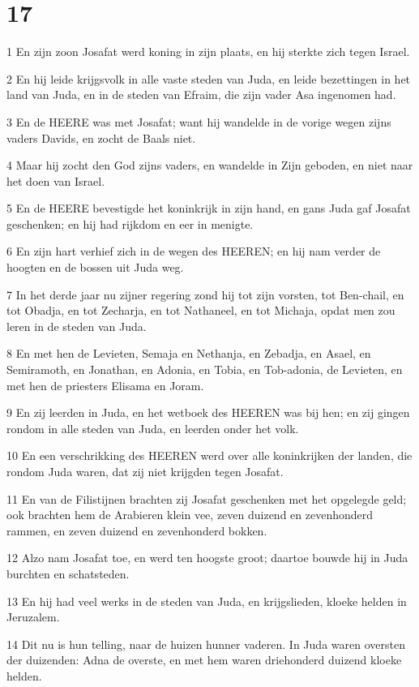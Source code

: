 \chapter{17}

\par 1 En zijn zoon Josafat werd koning in zijn plaats, en hij sterkte zich tegen Israel.
\par 2 En hij leide krijgsvolk in alle vaste steden van Juda, en leide bezettingen in het land van Juda, en in de steden van Efraim, die zijn vader Asa ingenomen had.
\par 3 En de HEERE was met Josafat; want hij wandelde in de vorige wegen zijns vaders Davids, en zocht de Baals niet.
\par 4 Maar hij zocht den God zijns vaders, en wandelde in Zijn geboden, en niet naar het doen van Israel.
\par 5 En de HEERE bevestigde het koninkrijk in zijn hand, en gans Juda gaf Josafat geschenken; en hij had rijkdom en eer in menigte.
\par 6 En zijn hart verhief zich in de wegen des HEEREN; en hij nam verder de hoogten en de bossen uit Juda weg.
\par 7 In het derde jaar nu zijner regering zond hij tot zijn vorsten, tot Ben-chail, en tot Obadja, en tot Zecharja, en tot Nathaneel, en tot Michaja, opdat men zou leren in de steden van Juda.
\par 8 En met hen de Levieten, Semaja en Nethanja, en Zebadja, en Asael, en Semiramoth, en Jonathan, en Adonia, en Tobia, en Tob-adonia, de Levieten, en met hen de priesters Elisama en Joram.
\par 9 En zij leerden in Juda, en het wetboek des HEEREN was bij hen; en zij gingen rondom in alle steden van Juda, en leerden onder het volk.
\par 10 En een verschrikking des HEEREN werd over alle koninkrijken der landen, die rondom Juda waren, dat zij niet krijgden tegen Josafat.
\par 11 En van de Filistijnen brachten zij Josafat geschenken met het opgelegde geld; ook brachten hem de Arabieren klein vee, zeven duizend en zevenhonderd rammen, en zeven duizend en zevenhonderd bokken.
\par 12 Alzo nam Josafat toe, en werd ten hoogste groot; daartoe bouwde hij in Juda burchten en schatsteden.
\par 13 En hij had veel werks in de steden van Juda, en krijgslieden, kloeke helden in Jeruzalem.
\par 14 Dit nu is hun telling, naar de huizen hunner vaderen. In Juda waren oversten der duizenden: Adna de overste, en met hem waren driehonderd duizend kloeke helden.
